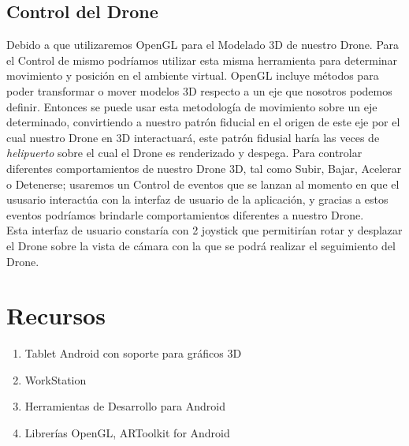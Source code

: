\documentclass[a4paper]{article}
\begin{document}

\subsection{Control del Drone}
Debido a que utilizaremos OpenGL para el Modelado 3D de nuestro Drone. Para el Control de mismo podríamos utilizar esta misma herramienta para determinar movimiento y posición en el ambiente virtual. OpenGL incluye métodos para poder transformar o mover modelos 3D respecto a un eje que nosotros podemos definir. Entonces se puede usar esta metodología de movimiento sobre un eje determinado, convirtiendo a nuestro patrón fiducial en el origen de este eje por el cual nuestro Drone en 3D interactuará, este patrón fidusial haría las veces de \textit{helipuerto} sobre el cual el Drone es renderizado y despega.
Para controlar diferentes comportamientos de nuestro Drone 3D, tal como Subir, Bajar, Acelerar o Detenerse; usaremos un Control de eventos que se lanzan al momento en que el ususario interactúa con la interfaz de usuario de la aplicación, y gracias a estos eventos podríamos brindarle comportamientos diferentes a nuestro Drone.\\
Esta interfaz de usuario constaría con 2 joystick que permitirían rotar y desplazar el Drone sobre la vista de cámara con la que se podrá realizar el seguimiento del Drone.

\section{Recursos}
\begin{enumerate}
  \item Tablet Android con soporte para gráficos 3D
  \item WorkStation
  \item Herramientas de Desarrollo para Android
  \item Librerías OpenGL, ARToolkit for Android
\end{enumerate}




%

\end{document}
